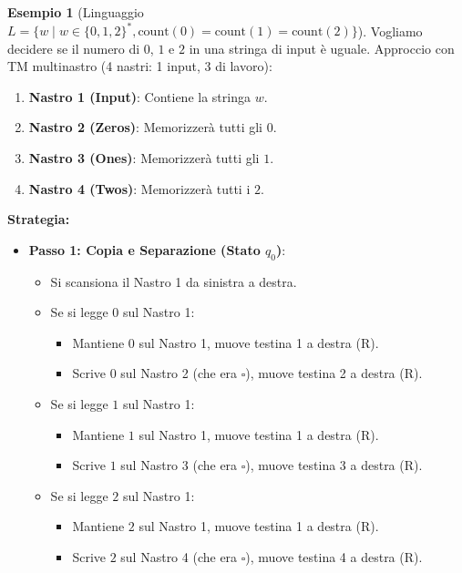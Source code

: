 \documentclass[a4paper]{article}
\theoremstyle{definition} %
\newtheorem{example}{Esempio}
\newcommand{\blankS}{\ensuremath{\square}}
\begin{document}
\begin{example}[Linguaggio $L = \{w \mid w \in \{0,1,2\}^*, \text{count}(0)=\text{count}(1)=\text{count}(2)\}$]
Vogliamo decidere se il numero di $0$, $1$ e $2$ in una stringa di input è uguale.
Approccio con TM multinastro (4 nastri: 1 input, 3 di lavoro):
\begin{enumerate}
    \item \textbf{Nastro 1 (Input)}: Contiene la stringa $w$.
    \item \textbf{Nastro 2 (Zeros)}: Memorizzerà tutti gli $0$.
    \item \textbf{Nastro 3 (Ones)}: Memorizzerà tutti gli $1$.
    \item \textbf{Nastro 4 (Twos)}: Memorizzerà tutti i $2$.
\end{enumerate}
\textbf{Strategia:}
\begin{itemize}
    \item \textbf{Passo 1: Copia e Separazione (Stato $q_0$)}:
        \begin{itemize}
            \item Si scansiona il Nastro 1 da sinistra a destra.
            \item Se si legge $0$ sul Nastro 1:
                \begin{itemize}
                    \item Mantiene $0$ sul Nastro 1, muove testina 1 a destra (R).
                    \item Scrive $0$ sul Nastro 2 (che era $\blankS$), muove testina 2 a destra (R).
                \end{itemize}
            \item Se si legge $1$ sul Nastro 1:
                \begin{itemize}
                    \item Mantiene $1$ sul Nastro 1, muove testina 1 a destra (R).
                    \item Scrive $1$ sul Nastro 3 (che era $\blankS$), muove testina 3 a destra (R).
                \end{itemize}
            \item Se si legge $2$ sul Nastro 1:
                \begin{itemize}
                    \item Mantiene $2$ sul Nastro 1, muove testina 1 a destra (R).
                    \item Scrive $2$ sul Nastro 4 (che era $\blankS$), muove testina 4 a destra (R).
                \end{itemize}

\end{itemize}
\end{itemize}
\end{example}
\end{document}
